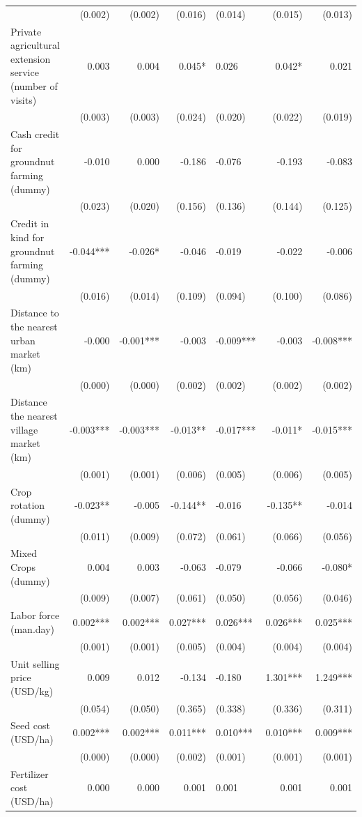 \documentclass[
]{article}
\begin{document}
\begin{longtable}[t]{lrrrlrr}
 & (0.002) & (0.002) & (0.016) & (0.014) & (0.015) & (0.013)\\
Private agricultural extension service (number of visits) & 0.003 & 0.004 & 0.045* & 0.026 & 0.042* & 0.021\\
 & (0.003) & (0.003) & (0.024) & (0.020) & (0.022) & (0.019)\\
Cash credit for groundnut farming (dummy) & -0.010 & 0.000 & -0.186 & -0.076 & -0.193 & -0.083\\
 & (0.023) & (0.020) & (0.156) & (0.136) & (0.144) & (0.125)\\
Credit in kind for groundnut farming (dummy) & -0.044*** & -0.026* & -0.046 & -0.019 & -0.022 & -0.006\\
 & (0.016) & (0.014) & (0.109) & (0.094) & (0.100) & (0.086)\\
Distance to the nearest urban market (km) & -0.000 & -0.001*** & -0.003 & -0.009*** & -0.003 & -0.008***\\
 & (0.000) & (0.000) & (0.002) & (0.002) & (0.002) & (0.002)\\
Distance the nearest village market (km) & -0.003*** & -0.003*** & -0.013** & -0.017*** & -0.011* & -0.015***\\
 & (0.001) & (0.001) & (0.006) & (0.005) & (0.006) & (0.005)\\
Crop rotation (dummy) & -0.023** & -0.005 & -0.144** & -0.016 & -0.135** & -0.014\\
 & (0.011) & (0.009) & (0.072) & (0.061) & (0.066) & (0.056)\\
Mixed Crops (dummy) & 0.004 & 0.003 & -0.063 & -0.079 & -0.066 & -0.080*\\
 & (0.009) & (0.007) & (0.061) & (0.050) & (0.056) & (0.046)\\
Labor force (man.day) & 0.002*** & 0.002*** & 0.027*** & 0.026*** & 0.026*** & 0.025***\\
 & (0.001) & (0.001) & (0.005) & (0.004) & (0.004) & (0.004)\\
Unit selling price (USD/kg) & 0.009 & 0.012 & -0.134 & -0.180 & 1.301*** & 1.249***\\
 & (0.054) & (0.050) & (0.365) & (0.338) & (0.336) & (0.311)\\
Seed cost (USD/ha) & 0.002*** & 0.002*** & 0.011*** & 0.010*** & 0.010*** & 0.009***\\
 & (0.000) & (0.000) & (0.002) & (0.001) & (0.001) & (0.001)\\
Fertilizer cost (USD/ha) & 0.000 & 0.000 & 0.001 & 0.001 & 0.001 & 0.001\\

\end{longtable}
\end{document}
